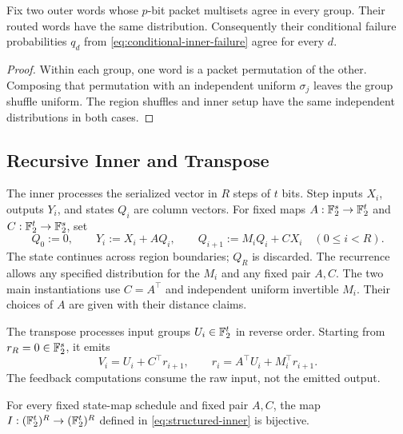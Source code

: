 \begin{lemma}
\label{lem:packet-route-symmetry}
Fix two outer words whose $p$-bit packet multisets agree in every group.
Their routed words have the same distribution. Consequently their
conditional failure probabilities $q_d$ from
\eqref{eq:conditional-inner-failure} agree for every $d$.
\end{lemma}

\begin{proof}
Within each group, one word is a packet permutation of the other.
Composing that permutation with an independent uniform $\sigma_j$ leaves
the group shuffle uniform. The region shuffles and inner setup have the
same independent distributions in both cases.
\end{proof}

\subsection{Recursive Inner and Transpose}

The inner processes the serialized vector in $R$ steps of $t$ bits.
Step inputs $X_i$, outputs $Y_i$, and states $Q_i$ are column vectors.
For fixed maps $A:\mathbb F_2^s\to\mathbb F_2^t$ and
$C:\mathbb F_2^t\to\mathbb F_2^s$, set
\begin{equation}
 Q_0:=0,\qquad
 Y_i:=X_i+A Q_i,\qquad
 Q_{i+1}:=M_iQ_i+C X_i
 \quad(0\le i<R).
 \label{eq:structured-inner}
\end{equation}
The state continues across region boundaries; $Q_R$ is discarded.
The recurrence allows any specified distribution for the $M_i$ and any
fixed pair $A,C$. The two main instantiations use $C=A^\top$ and
independent uniform invertible $M_i$. Their choices of $A$ are given
with their distance claims.

The transpose processes input groups $U_i\in\mathbb F_2^t$ in reverse order.
Starting from $r_R=0\in\mathbb F_2^s$, it emits
\begin{equation}
 V_i=U_i+C^\top r_{i+1},\qquad
 r_i=A^\top U_i+M_i^\top r_{i+1}.
 \label{eq:structured-inner-transpose}
\end{equation}
The feedback computations consume the raw input, not the emitted output.

\begin{lemma}
\label{lem:structured-inner-bijective}
For every fixed state-map schedule and fixed pair $A,C$, the map
$I:(\mathbb F_2^t)^R\to(\mathbb F_2^t)^R$ defined in
\eqref{eq:structured-inner} is bijective.
\end{lemma}

